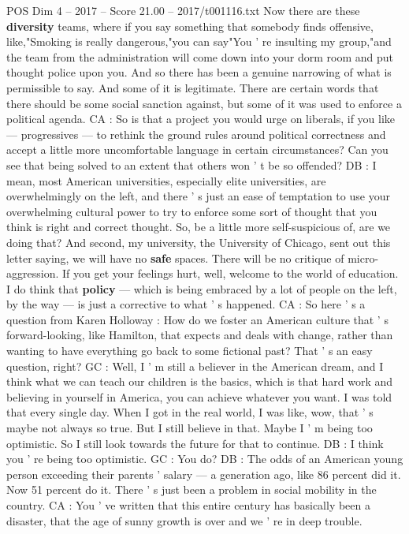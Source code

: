 \begin{textsample}{POS Dim 4 – 2017 – Score 21.00 – 2017/t001116.txt}
Now there are these \textbf{diversity} teams, where if you say something that somebody finds offensive, like,"Smoking is really dangerous,"you can say"You ' re insulting my group,"and the team from the administration will come down into your dorm room and put thought police upon you.
And so there has been a genuine narrowing of what is permissible to say.
And some of it is legitimate.
There are certain words that there should be some social sanction against, but some of it was used to enforce a political agenda.
CA : So is that a project you would urge on liberals, if you like — progressives — to rethink the ground rules around political correctness and accept a little more uncomfortable language in certain circumstances?
Can you see that being solved to an extent that others won ' t be so offended?
DB : I mean, most American universities, especially elite universities, are overwhelmingly on the left, and there ' s just an ease of temptation to use your overwhelming cultural power to try to enforce some sort of thought that you think is right and correct thought.
So, be a little more self-suspicious of, are we doing that?
And second, my university, the University of Chicago, sent out this letter saying, we will have no \textbf{safe} spaces.
There will be no critique of micro-aggression.
If you get your feelings hurt, well, welcome to the world of education.
I do think that \textbf{policy} — which is being embraced by a lot of people on the left, by the way — is just a corrective to what ' s happened.
CA : So here ' s a question from Karen Holloway : How do we foster an American culture that ' s forward-looking, like Hamilton, that expects and deals with change, rather than wanting to have everything go back to some fictional past?
That ' s an easy question, right?
GC : Well, I ' m still a believer in the American dream, and I think what we can teach our children is the basics, which is that hard work and believing in yourself in America, you can achieve whatever you want.
I was told that every single day.
When I got in the real world, I was like, wow, that ' s maybe not always so true.
But I still believe in that.
Maybe I ' m being too optimistic.
So I still look towards the future for that to continue.
DB : I think you ' re being too optimistic.
GC : You do?
DB : The odds of an American young person exceeding their parents ' salary — a generation ago, like 86 percent did it.
Now 51 percent do it.
There ' s just been a problem in social mobility in the country.
CA : You ' ve written that this entire century has basically been a disaster, that the age of sunny growth is over and we ' re in deep trouble.

\end{textsample}
